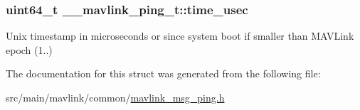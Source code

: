 \hypertarget{struct____mavlink__ping__t_a78bf2339554a175c2b5423fee61cf619}{
\subsubsection[{time\+\_\+usec}]{\setlength{\rightskip}{0pt plus 5cm}uint64\+\_\+t \+\_\+\+\_\+mavlink\+\_\+ping\+\_\+t\+::time\+\_\+usec}}\label{struct____mavlink__ping__t_a78bf2339554a175c2b5423fee61cf619}


Unix timestamp in microseconds or since system boot if smaller than M\+A\+V\+Link epoch (1..) 



The documentation for this struct was generated from the following file\+:\begin{DoxyCompactItemize}
\item 
src/main/mavlink/common/\hyperlink{mavlink__msg__ping_8h}{mavlink\+\_\+msg\+\_\+ping.\+h}\end{DoxyCompactItemize}
